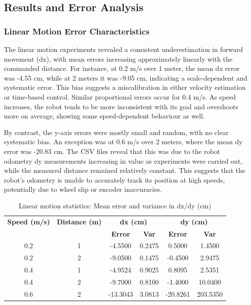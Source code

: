 \documentclass[a4paper, 12pt]{article}
\begin{document}
    \subsection{Results and Error Analysis}

    \subsubsection{Linear Motion Error Characteristics}

    The linear motion experiments revealed a consistent underestimation in forward movement (dx), with mean errors increasing approximately linearly with the commanded distance. For instance, at 0.2 m/s over 1 meter, the mean dx error was -4.55 cm, while at 2 meters it was -9.05 cm, indicating a scale-dependent and systematic error. This bias suggests a miscalibration in either velocity estimation or time-based control. Similar proportional errors occur for 0.4 m/s. As speed increases, the robot tends to be more inconsistent with its goal and overshoots more on average, showing some speed-dependent behaviour as well. 
    
    By contrast, the y-axis errors were mostly small and random, with no clear systematic bias. An exception was at 0.6 m/s over 2 meters, where the mean dy error was -20.83 cm. The CSV files reveal that this was due to the robot odometry dy measurements increasing in value as experiments were carried out, while the measured distance remained relatively constant. This suggests that the robot's odometry is unable to accurately track its position at high speeds, potentially due to wheel slip or encoder inaccuracies.

    \begin{table}[H]
    \centering
    \scriptsize
    \begin{tabular}{|c|c|cc|cc|}
    \hline
    \textbf{Speed (m/s)} & \textbf{Distance (m)} &
    \multicolumn{2}{c|}{\textbf{dx (cm)}} & \multicolumn{2}{c|}{\textbf{dy (cm)}} \\
    \cline{3-6}
    & & \textbf{Error} & \textbf{Var} & \textbf{Error} & \textbf{Var} \\
    \hline
    0.2 & 1 & -4.5500 & 0.2475 &  0.5000 & 1.4500 \\
    0.2 & 2 & -9.0500 & 0.1475 & -0.4500 & 2.9475 \\
    0.4 & 1 & -4.9524 & 0.9025 &  0.8095 & 2.5351 \\
    0.4 & 2 & -9.7000 & 0.8100 & -1.4000 & 10.0400 \\
    0.6 & 2 & -13.3043 & 3.0813 & -20.8261 & 203.5350 \\
    \hline
    \end{tabular}
    \caption{Linear motion statistics: Mean error and variance in dx/dy (cm)}
    \end{table} 
\end{document}
